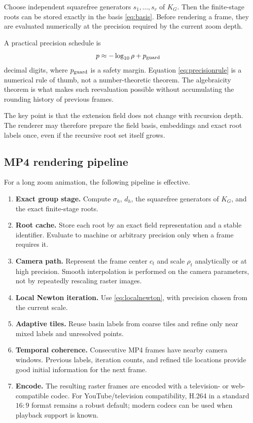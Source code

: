 \documentclass[11pt,a4paper]{article}
\theoremstyle{definition}
\begin{document}
Choose independent squarefree generators $s_1,\ldots,s_r$ of $K_G$.  Then the finite-stage roots can be stored exactly in the basis \eqref{eq:basis}.  Before rendering a frame, they are evaluated numerically at the precision required by the current zoom depth.

A practical precision schedule is
\begin{equation}
\label{eq:precisionrule}
p\approx -\log_{10}\rho+p_{\rm guard}
\end{equation}
 decimal digits, where $p_{\rm guard}$ is a safety margin.  Equation \eqref{eq:precisionrule} is a numerical rule of thumb, not a number-theoretic theorem.  The algebraicity theorem is what makes such reevaluation possible without accumulating the rounding history of previous frames.

The key point is that the extension field does not change with recursion depth.  The renderer may therefore prepare the field basis, embeddings and exact root labels once, even if the recursive root set itself grows.

\subsection{MP4 rendering pipeline}

For a long zoom animation, the following pipeline is effective.

\begin{enumerate}[label=(\roman*),leftmargin=12mm]
\item \textbf{Exact group stage.} Compute $\sigma_h$, $d_h$, the squarefree generators of $K_G$, and the exact finite-stage roots.
\item \textbf{Root cache.} Store each root by an exact field representation and a stable identifier.  Evaluate to machine or arbitrary precision only when a frame requires it.
\item \textbf{Camera path.} Represent the frame center $c_t$ and scale $\rho_t$ analytically or at high precision.  Smooth interpolation is performed on the camera parameters, not by repeatedly rescaling raster images.
\item \textbf{Local Newton iteration.} Use \eqref{eq:localnewton}, with precision chosen from the current scale.
\item \textbf{Adaptive tiles.} Reuse basin labels from coarse tiles and refine only near mixed labels and unresolved points.
\item \textbf{Temporal coherence.} Consecutive MP4 frames have nearby camera windows.  Previous labels, iteration counts, and refined tile locations provide good initial information for the next frame.
\item \textbf{Encode.} The resulting raster frames are encoded with a television- or web-compatible codec.  For YouTube/television compatibility, H.264 in a standard $16{:}9$ format remains a robust default; modern codecs can be used when playback support is known.
\end{enumerate}
\end{document}
